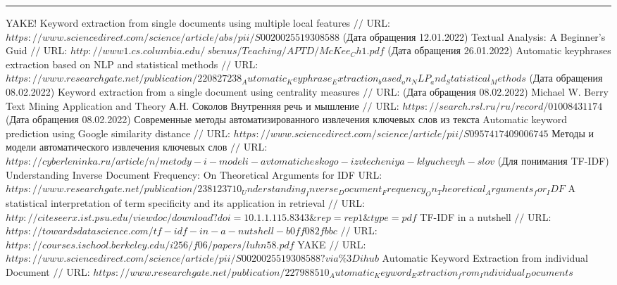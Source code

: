 \makeatletter \renewcommand{} \makeatother
\renewcommand\refname{Список использованных источников}
\begin{thebibliography}{00}
	\hrule	
	
	YAKE! Keyword extraction from single documents using multiple local features $//$ URL: $https://www.sciencedirect.com/science/article/abs/pii/S0020025519308588$ (Дата обращения 12.01.2022)
	Textual Analysis: A Beginner's Guid  $//$ URL: $http://www1.cs.columbia.edu/~sbenus/Teaching/APTD/McKee_Ch1.pdf$ (Дата обращения 26.01.2022)
	Automatic keyphrases extraction based on NLP  and statistical methods $//$ URL: $https://www.researchgate.net/publication/220827238_Automatic_Keyphrase_Extraction_based_on_NLP_and_Statistical_Methods$ (Дата обращения 08.02.2022)
	Keyword extraction from a single document using centrality measures $//$ URL:  (Дата обращения 08.02.2022)
	Michael W. Berry Text Mining Application and Theory
	А.Н. Соколов Внутренняя речь и мышление $//$ URL: $https://search.rsl.ru/ru/record/01008431174$ (Дата обращения 08.02.2022)
	Современные методы автоматизированного извлечения ключевых слов из текста
	Automatic keyword prediction using Google similarity distance $//$ URL: $https://www.sciencedirect.com/science/article/pii/S0957417409006745$
	Методы и модели автоматического извлечения ключевых слов $//$ URL: $https://cyberleninka.ru/article/n/metody-i-modeli-avtomaticheskogo-izvlecheniya-klyuchevyh-slov$
	(Для понимания TF-IDF) Understanding Inverse Document Frequency: On Theoretical Arguments for IDF URL: $https://www.researchgate.net/publication/238123710_Understanding_Inverse_Document_Frequency_On_Theoretical_Arguments_for_IDF$
	A statistical interpretation of term specificity and its application in retrieval $//$ URL: $http://citeseerx.ist.psu.edu/viewdoc/download?doi=10.1.1.115.8343\&rep=rep1\&type=pdf$
	TF-IDF in a nutshell $//$ URL: $https://towardsdatascience.com/tf-idf-in-a-nutshell-b0ff082fbbc$
	 $//$ URL: $https://courses.ischool.berkeley.edu/i256/f06/papers/luhn58.pdf$
	YAKE $//$ URL: $https://www.sciencedirect.com/science/article/pii/S0020025519308588?via\%3Dihub$
	Automatic Keyword Extraction from individual Document
	$//$ URL: $https://www.researchgate.net/publication/227988510_Automatic_Keyword_Extraction_from_Individual_Documents$

\end{thebibliography}
